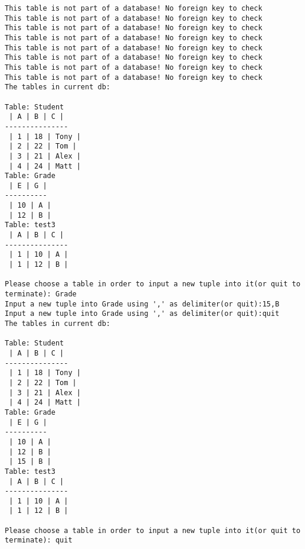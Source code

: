 \documentclass[11pt]{article}
\begin{document}
    \begin{Verbatim}[commandchars=\\\{\}]
This table is not part of a database! No foreign key to check
This table is not part of a database! No foreign key to check
This table is not part of a database! No foreign key to check
This table is not part of a database! No foreign key to check
This table is not part of a database! No foreign key to check
This table is not part of a database! No foreign key to check
This table is not part of a database! No foreign key to check
This table is not part of a database! No foreign key to check
The tables in current db: 

Table: Student
 | A | B | C |
---------------
 | 1 | 18 | Tony | 
 | 2 | 22 | Tom | 
 | 3 | 21 | Alex | 
 | 4 | 24 | Matt | 
Table: Grade
 | E | G |
----------
 | 10 | A | 
 | 12 | B | 
Table: test3
 | A | B | C |
---------------
 | 1 | 10 | A | 
 | 1 | 12 | B | 

Please choose a table in order to input a new tuple into it(or quit to terminate): Grade
Input a new tuple into Grade using ',' as delimiter(or quit):15,B
Input a new tuple into Grade using ',' as delimiter(or quit):quit
The tables in current db: 

Table: Student
 | A | B | C |
---------------
 | 1 | 18 | Tony | 
 | 2 | 22 | Tom | 
 | 3 | 21 | Alex | 
 | 4 | 24 | Matt | 
Table: Grade
 | E | G |
----------
 | 10 | A | 
 | 12 | B | 
 | 15 | B | 
Table: test3
 | A | B | C |
---------------
 | 1 | 10 | A | 
 | 1 | 12 | B | 

Please choose a table in order to input a new tuple into it(or quit to terminate): quit

    \end{Verbatim}
\end{document}

